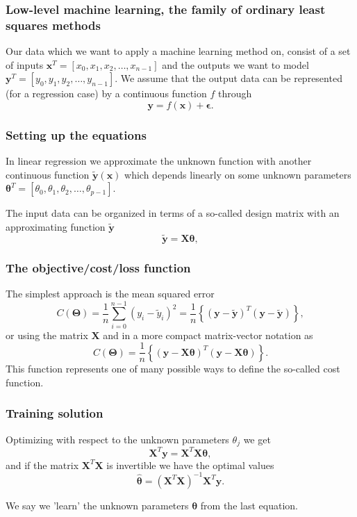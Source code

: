 \documentclass{beamer}
\begin{document}
\begin{frame}
\frametitle{Low-level machine learning, the family of ordinary least squares methods}

Our data which we want to apply a machine learning method on, consist
of a set of inputs $\bm{x}^T=[x_0,x_1,x_2,\dots,x_{n-1}]$ and the
outputs we want to model $\bm{y}^T=[y_0,y_1,y_2,\dots,y_{n-1}]$.
We assume  that the output data can be represented (for a regression case) by a continuous function $f$
through
\[
\bm{y}=f(\bm{x})+\bm{\epsilon}.
\]
\end{frame}

\begin{frame}
\frametitle{Setting up the equations}

In linear regression we approximate the unknown function with another
continuous function $\tilde{\bm{y}}(\bm{x})$ which depends linearly on
some unknown parameters
$\bm{\theta}^T=[\theta_0,\theta_1,\theta_2,\dots,\theta_{p-1}]$.

The input data can be organized in terms of a so-called design matrix 
with an approximating function $\bm{\tilde{y}}$ 
\[
\bm{\tilde{y}}= \bm{X}\bm{\theta},
\]
\end{frame}

\begin{frame}
\frametitle{The objective/cost/loss function}

The  simplest approach is the mean squared error
\[
C(\bm{\Theta})=\frac{1}{n}\sum_{i=0}^{n-1}\left(y_i-\tilde{y}_i\right)^2=\frac{1}{n}\left\{\left(\bm{y}-\bm{\tilde{y}}\right)^T\left(\bm{y}-\bm{\tilde{y}}\right)\right\},
\]
or using the matrix $\bm{X}$ and in a more compact matrix-vector notation as
\[
C(\bm{\Theta})=\frac{1}{n}\left\{\left(\bm{y}-\bm{X}\bm{\theta}\right)^T\left(\bm{y}-\bm{X}\bm{\theta}\right)\right\}.
\]
This function represents one of many possible ways to define the so-called cost function.
\end{frame}

\begin{frame}
\frametitle{Training solution}

Optimizing with respect to the unknown parameters $\theta_j$ we get 
\[
\bm{X}^T\bm{y} = \bm{X}^T\bm{X}\bm{\theta},  
\]
and if the matrix $\bm{X}^T\bm{X}$ is invertible we have the optimal values
\[
\hat{\bm{\theta}} =\left(\bm{X}^T\bm{X}\right)^{-1}\bm{X}^T\bm{y}.
\]

We say we 'learn' the unknown parameters $\bm{\theta}$ from the last equation.
\end{frame}
\end{document}
